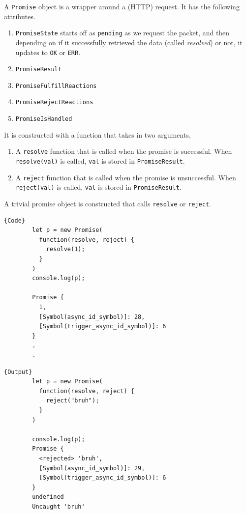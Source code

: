 \documentclass{article}
\begin{document}
    \begin{definition}[Promise]
      A \texttt{Promise} object is a wrapper around a (HTTP) request. It has the following attributes. 
      \begin{enumerate}
        \item \texttt{PromiseState} starts off as \texttt{pending} as we request the packet, and then depending on if it successfully retrieved the data (called \textit{resolved}) or not, it updates to \texttt{OK} or \texttt{ERR}. 
        \item \texttt{PromiseResult} 
        \item \texttt{PromiseFulfillReactions}
        \item \texttt{PromiseRejectReactions}
        \item \texttt{PromiseIsHandled} 
      \end{enumerate}
      
      It is constructed with a function that takes in two arguments. 
      \begin{enumerate}
        \item A \texttt{resolve} function that is called when the promise is successful. When \texttt{resolve(val)} is called, \texttt{val} is stored in \texttt{PromiseResult}. 
        \item A \texttt{reject} function that is called when the promise is unsuccessful. When \texttt{reject(val)} is called, \texttt{val} is stored in \texttt{PromiseResult}.  
      \end{enumerate}
    \end{definition}

    \begin{example}
      A trivial promise object is constructed that calls \texttt{resolve} or \texttt{reject}. 

      \noindent\begin{minipage}{.5\textwidth}
      \begin{lstlisting}[]{Code}
        let p = new Promise(
          function(resolve, reject) {
            resolve(1); 
          }
        )
        console.log(p); 

        Promise {
          1,
          [Symbol(async_id_symbol)]: 28,
          [Symbol(trigger_async_id_symbol)]: 6
        }
        .
        .
      \end{lstlisting}
      \end{minipage}
      \hfill
      \begin{minipage}{.49\textwidth}
      \begin{lstlisting}[]{Output}
        let p = new Promise(
          function(resolve, reject) {
            reject("bruh"); 
          }
        )

        console.log(p); 
        Promise {
          <rejected> 'bruh',
          [Symbol(async_id_symbol)]: 29,
          [Symbol(trigger_async_id_symbol)]: 6
        }
        undefined
        Uncaught 'bruh'
      \end{lstlisting}
      \end{minipage}
    \end{example}
\end{document}
